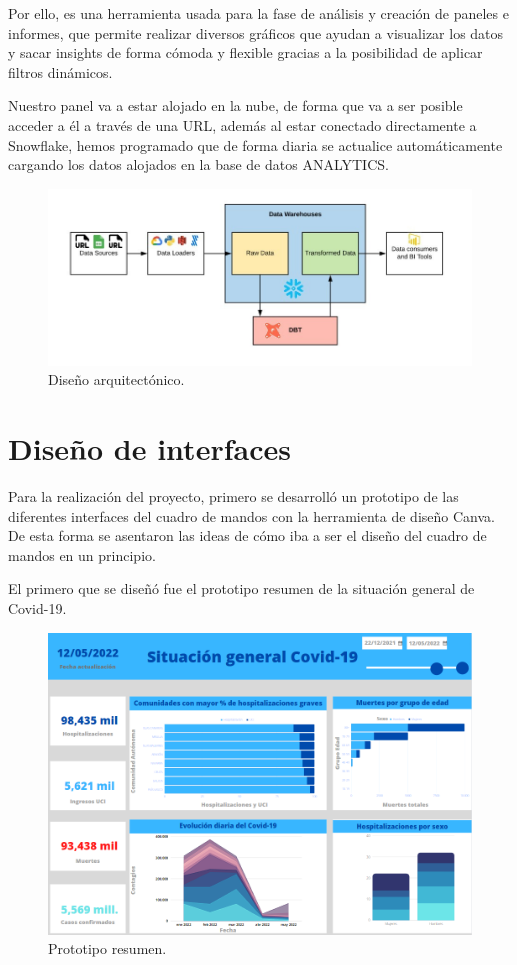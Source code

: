 Por ello, es una herramienta usada para la fase de análisis y creación de paneles e informes, que permite realizar diversos gráficos que ayudan a visualizar los datos y sacar insights de forma cómoda y flexible gracias a la posibilidad de aplicar filtros dinámicos.

Nuestro panel va a estar alojado en la nube, de forma que va a ser posible acceder a él a través de una URL, además al estar conectado directamente a Snowflake, hemos programado que de forma diaria se actualice automáticamente cargando los datos alojados en la base de datos ANALYTICS.

\begin{figure}[h]
    \advance\leftskip-2cm 
    \includegraphics[scale=0.55]{img/dis_arq.jpeg}
    \caption{Diseño arquitectónico.}
\end{figure}

\section{Diseño de interfaces}
Para la realización del proyecto, primero se desarrolló un prototipo de las diferentes interfaces del cuadro de mandos con la herramienta de diseño Canva. De esta forma se asentaron las ideas de cómo iba a ser el diseño del cuadro de mandos en un principio.

\newpage
El primero que se diseñó fue el prototipo resumen de la situación general de Covid-19. 

\begin{figure}[h]
    \advance\leftskip-1cm 
    \includegraphics[scale=0.7]{img/prototipo_resumen.PNG}
    \caption{Prototipo resumen.}
\end{figure}

